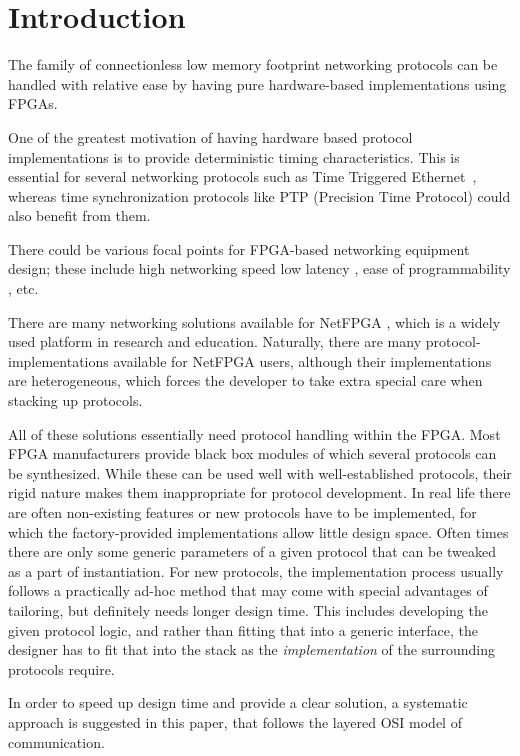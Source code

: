 \documentclass[conference]{IEEEtran}
\begin{document}

\section{Introduction}\label{sec:Motivation}

The family of connectionless low memory footprint networking protocols can be handled with relative ease by having pure
hardware-based implementations using FPGAs.

One of the greatest motivation of having hardware based protocol implementations is to provide deterministic timing
characteristics. This is essential for several networking protocols such as Time Triggered Ethernet~\cite{SAE_AS6802},
whereas time synchronization protocols like PTP (Precision Time Protocol) \cite{PTP_standard}could also benefit from
them.

There could be various focal points for FPGA-based networking equipment design; these include high networking speed
\cite{C-GEP_HPSR} low latency \cite{related:TrustNode}, ease of programmability \cite{C-Board_NEMA}, etc.

There are many networking solutions available for NetFPGA \cite{NetFPGA}, which is a widely used platform
in research and education. Naturally, there are many protocol-implementations available for NetFPGA users, although
their implementations are heterogeneous, which forces the developer to take extra special care when stacking up
protocols.

All of these solutions essentially need protocol handling within the FPGA. Most FPGA manufacturers provide black box
modules of which several protocols can be synthesized. While these can be used well with well-established protocols,
their rigid nature makes them inappropriate for protocol development.
In real life there are often non-existing features
or new protocols have to be implemented, for which the factory-provided implementations allow little design space.
Often times there are only some generic parameters of a given protocol that can be tweaked as a part of instantiation.
For new protocols, the implementation process usually follows a practically ad-hoc method that may come with special
advantages of tailoring, but definitely needs longer design time.
This includes developing the given protocol logic, and rather than fitting that into a generic interface,
the designer has to fit that into the stack as the \emph{implementation} of the surrounding protocols require.

In order to speed up design time and provide a clear solution, a systematic approach is suggested in this paper,
that follows the layered OSI model of communication.
\end{document}
